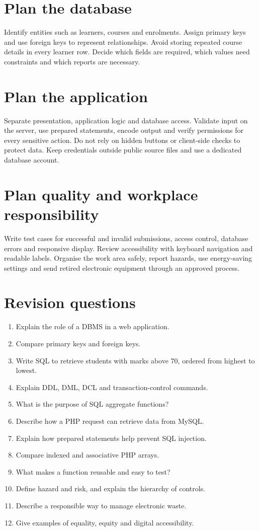 \documentclass[11pt,openany,oneside]{book}
\begin{document}
\section{Plan the database}
Identify entities such as learners, courses and enrolments. Assign primary keys and use foreign keys to represent relationships. Avoid storing repeated course details in every learner row. Decide which fields are required, which values need constraints and which reports are necessary.

\section{Plan the application}
Separate presentation, application logic and database access. Validate input on the server, use prepared statements, encode output and verify permissions for every sensitive action. Do not rely on hidden buttons or client-side checks to protect data. Keep credentials outside public source files and use a dedicated database account.

\section{Plan quality and workplace responsibility}
Write test cases for successful and invalid submissions, access control, database errors and responsive display. Review accessibility with keyboard navigation and readable labels. Organise the work area safely, report hazards, use energy-saving settings and send retired electronic equipment through an approved process.

\section{Revision questions}
\begin{enumerate}
\item Explain the role of a DBMS in a web application.
\item Compare primary keys and foreign keys.
\item Write SQL to retrieve students with marks above 70, ordered from highest to lowest.
\item Explain DDL, DML, DCL and transaction-control commands.
\item What is the purpose of SQL aggregate functions?
\item Describe how a PHP request can retrieve data from MySQL.
\item Explain how prepared statements help prevent SQL injection.
\item Compare indexed and associative PHP arrays.
\item What makes a function reusable and easy to test?
\item Define hazard and risk, and explain the hierarchy of controls.
\item Describe a responsible way to manage electronic waste.
\item Give examples of equality, equity and digital accessibility.
\end{enumerate}
\end{document}
